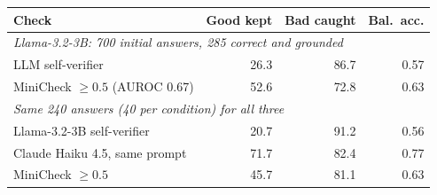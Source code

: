 \begin{tabular}{lrrr}
\toprule
Check & Good kept & Bad caught & Bal.\ acc. \\
\midrule
\multicolumn{4}{l}{\emph{Llama-3.2-3B: 700 initial answers, 285 correct and grounded}} \\
LLM self-verifier & 26.3 & 86.7 & 0.57 \\
MiniCheck $\geq 0.5$ (AUROC 0.67) & 52.6 & 72.8 & 0.63 \\
\midrule
\multicolumn{4}{l}{\emph{Same 240 answers (40 per condition) for all three}} \\
Llama-3.2-3B self-verifier & 20.7 & 91.2 & 0.56 \\
Claude Haiku 4.5, same prompt & 71.7 & 82.4 & 0.77 \\
MiniCheck $\geq 0.5$ & 45.7 & 81.1 & 0.63 \\
\bottomrule
\end{tabular}
